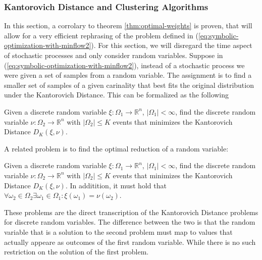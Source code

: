 \subsubsection{Kantorovich Distance and Clustering Algorithms}
In this section, a corrolary to theorem \ref{thm:optimal-weights} is proven, that will allow for a very efficient rephrasing of the problem defined in (\ref{eq:symbolic-optimization-with-minflow2}).
For this section, we will disregard the time aspect of stochastic processes and only consider random variables.
Suppose in (\ref{eq:symbolic-optimization-with-minflow2}), instead of a stochastic process we were given a set of samples from a random variable.
The assignment is to find a smaller set of samples of a given carinality that best fits the original distribution under the Kantorovich Distance.
This can be formalized as the following
\begin{problem}
\label{prb:CE-Kantorovich-randvar}
  Given a discrete random variable $\xi :\Omega_1\rightarrow \mathbb{R}^n$, $|\Omega_1|<\infty$, find the discrete random variable $\nu : \Omega_2\rightarrow\mathbb{R}^n$ with $|\Omega_2 | \leq K$ events that minimizes the Kantorovich Distance $D_K(\xi,\nu)$.
\end{problem}
A related problem is to find the optimal reduction of a random variable:
\begin{problem}
  \label{prb:DE-Kantorovich-randvar}
  Given a discrete random variable $\xi : \Omega_1\rightarrow \mathbb{R}^n$, $|\Omega_1|<\infty$, find the discrete random variable $\nu : \Omega_2\rightarrow\mathbb{R}^n$ with $|\Omega_2 | \leq K$ events that minimizes the Kantorovich Distance $D_K(\xi,\nu)$.
  In additition, it must hold that $\forall \omega_2\in\Omega_2\exists\omega_1\in\Omega_1 : \xi(\omega_1) = \nu(\omega_2)$.
\end{problem}
These problems are the direct transcription of the Kantorovich Distance problems for discrete random variables.
The difference between the two is that the random variable that is a solution to the second problem must map to values that actually appeare as outcomes of the first random variable.
While there is no such restriction on the solution of the first problem.

